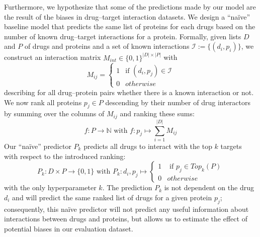 \documentclass{bioinfo}
\begin{document}
Furthermore, we hypothesize that some of the predictions made by our
model are the result of the biases in drug--target interaction
datasets. We design a ``na\"ive'' baseline model that predicts the
same list of proteins for each drugs based on the number of
known drug--target interactions for a protein. Formally, given lists
$D$ and $P$ of drugs and proteins and a set of known interactions
$\mathcal{I} := \{(d_i, p_i) \}$, we construct an interaction matrix
$M_{int}\in\{0,1\}^{|D|\times|P|}$ with
\begin{equation*}
	M_{ij} = \begin{cases}
		1 & \text{if } (d_i, p_j)\in \mathcal{I}\\
		0 & otherwise
	\end{cases}
\end{equation*}
describing for all drug--protein pairs whether there is a known
interaction or not. We now rank all proteins $p_j\in P$ descending by
their number of drug interactors by summing over the columns of
$M_{ij}$ and ranking these sums:
\begin{equation*}
	f: P \rightarrow \mathbb{N} \text{ with } f:p_j \mapsto \sum_{i=1}^{|D|}M_{ij}
\end{equation*}
Our ``na\"ive'' predictor $P_k$  predicts all drugs to interact with
the top $k$ targets
with respect to
the introduced ranking:
\begin{equation*}
	P_k: D\times P \rightarrow \{0,1\} \text{ with } P_k: d_i, p_j \mapsto \begin{cases}
		1 & \text{ if }p_j \in Top_{k}(P)\\
		0 & otherwise
	\end{cases}
\end{equation*}
with the only hyperparameter $k$.
The prediction $P_k$ is not dependent on the drug $d_i$ and will
predict the same ranked list of drugs for a given protein $p_j$;
consequently, this na\"ive predictor will not predict any useful
information about interactions between drugs and proteins, but allows
us to estimate the effect of potential biases in our evaluation
dataset.
\end{document}
